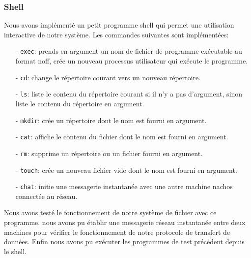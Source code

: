\documentclass[11pt]{article}
\theoremstyle{definition}
\theoremstyle{definition}
\begin{document}
\subsubsection{Shell}
Nous avons implémenté un petit programme shell qui permet une utilisation interactive de notre système. Les commandes suivantes sont implémentées:
\begin{itemize}
\item[-] \texttt{exec}: prends en argument un nom de fichier de programme exécutable au format noff, crée un nouveau processus utilisateur qui exécute le programme.
\item[-] \texttt{cd}: change le répertoire courant vers un nouveau répertoire.
\item[-] \texttt{ls}: liste le contenu du répertoire courant si il n'y a pas d'argument, sinon liste le contenu du répertoire en argument.
\item[-] \texttt{mkdir}: crée un répertoire dont le nom est fourni en argument.
\item[-] \texttt{cat}: affiche le contenu du fichier dont le nom est fourni en argument.
\item[-] \texttt{rm}: supprime un répertoire ou un fichier fourni en argument.
\item[-] \texttt{touch}: crée un nouveau fichier vide dont le nom est fourni en argument.
\item[-] \texttt{chat}: initie une messagerie instantanée avec une autre machine
  nachos connectée au réseau.
\end{itemize}
Nous avons testé le fonctionnement de notre système de fichier avec ce programme.
nous avons pu établir une messagerie réseau instantanée entre deux machines pour vérifier le fonctionnement de notre protocole de transfert de données.
Enfin nous avons pu exécuter les programmes de test précédent depuis le shell.
\end{document}
